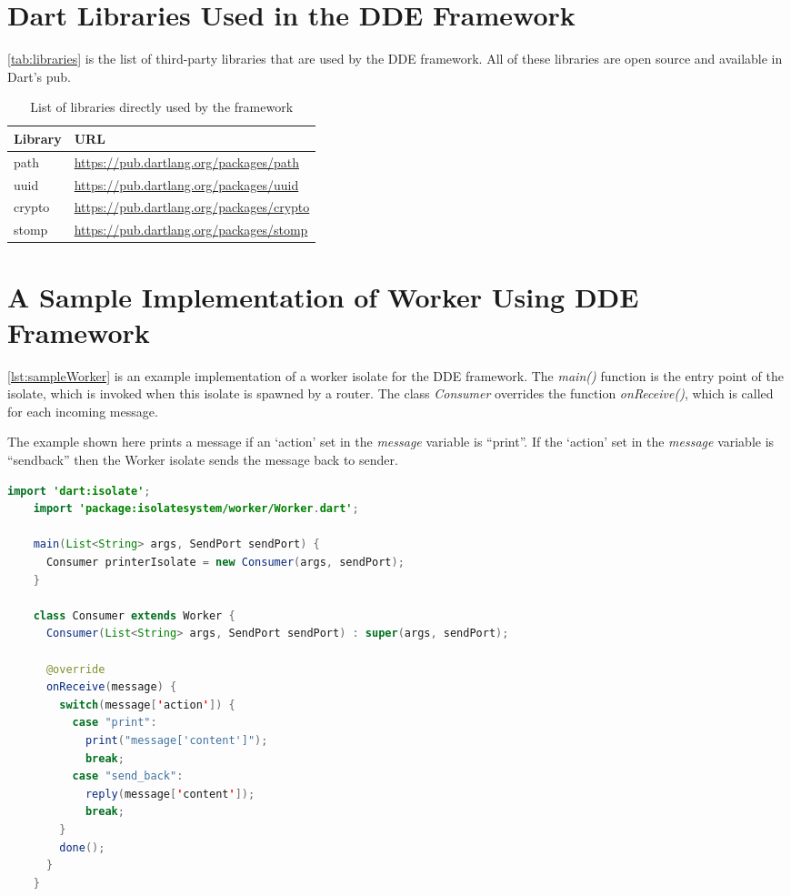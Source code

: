 \section{Dart Libraries Used in the \acrshort{DDE} Framework}
\autoref{tab:libraries} is the list of third-party libraries that are used by the \acrshort{DDE} framework. All of these libraries are open source and available in Dart's pub.

\begin{table}[htsb]
  \caption[Dependent libraries of the framework]{List of libraries directly used by the framework}\label{tab:libraries}
  \centering
  \begin{tabular}{l l}
    \toprule
      \bf{Library} & \bf{URL} \\
    \midrule
      path &  \url{https://pub.dartlang.org/packages/path}\\
      uuid &  \url{https://pub.dartlang.org/packages/uuid}\\
      crypto &  \url{https://pub.dartlang.org/packages/crypto}\\
      stomp &  \url{https://pub.dartlang.org/packages/stomp}\\
    \bottomrule
  \end{tabular}
\end{table}

\section{A Sample Implementation of Worker Using \acrshort{DDE} Framework}
\autoref{lst:sampleWorker} is an example implementation of a worker isolate for the \acrshort{DDE} framework. The \emph{main()} function is the entry point of the isolate, which is invoked when this isolate is spawned by a router. The class \emph{Consumer} overrides the function \emph{onReceive()}, which is called for each incoming message.

  The example shown here prints a message if an ‘action’
 set in the \emph{message} variable is “print”. If the ‘action’ set in the \emph{message} variable is “send\textunderscore{}back” then the Worker isolate sends the message back to sender.

\begin{lstlisting}[language=java,firstnumber=1, caption=A sample Worker isolate that can be deployed in the framework, label=lst:sampleWorker]
    import 'dart:isolate';
    import 'package:isolatesystem/worker/Worker.dart';

    main(List<String> args, SendPort sendPort) {
      Consumer printerIsolate = new Consumer(args, sendPort);
    }

    class Consumer extends Worker {
      Consumer(List<String> args, SendPort sendPort) : super(args, sendPort);

      @override
      onReceive(message) {
        switch(message['action']) {
          case "print":
            print("message['content']");
            break;
          case "send_back":
            reply(message['content']);
            break;
        }
        done();
      }
    }

\end{lstlisting}
